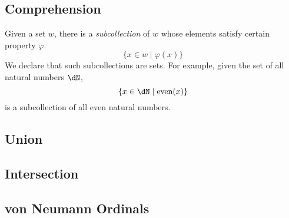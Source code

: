 \documentclass{amsart}
\begin{document}
\subsection{Comprehension}
\label{sec:comprehension}

Given a set $w$, there is a \emph{subcollection} of $w$ whose elements satisfy certain property $\varphi$.
\[
  \{ x \in w \mid \varphi(x) \}
\]
We declare that such subcollections are sets.
For example, given the set of all natural numbers $\dN$,
\[
  \{ x \in \dN \mid \mathrm{even}(x) \}
\]
is a subcollection of all even natural numbers.

\subsection{Union}
\label{sec:union}

\subsection{Intersection}
\label{sec:intersection}

\subsection{von Neumann Ordinals}
\label{sec:von-neumann-ordinals}
\end{document}
